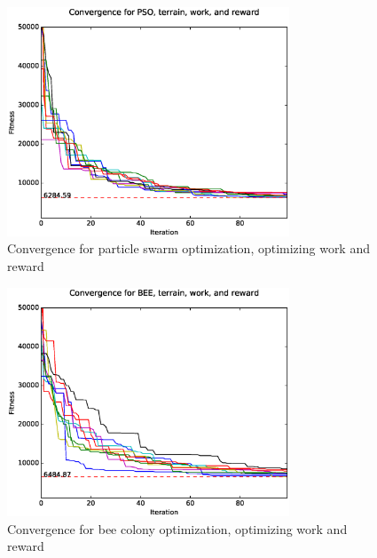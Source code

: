 \documentclass{tamuccthesis}
\begin{document}
\begin{figure}
    \captionsetup{justification=centering}
    \centering
        \includegraphics[width=0.75\textwidth,trim={0cm 0.75cm 0cm 0.75cm},clip]{conv_PSO_b.eps}
    \caption{Convergence for particle swarm optimization, optimizing work and reward}
    \label{fig:convergence_b_PSO}
\end{figure}

\begin{figure}
    \captionsetup{justification=centering}
    \centering
        \includegraphics[width=0.75\textwidth,trim={0cm 0.75cm 0cm 0.75cm},clip]{conv_BEE_b.eps}
    \caption{Convergence for bee colony optimization, optimizing work and reward}
    \label{fig:convergence_b_BEE}
\end{figure}
\end{document}

